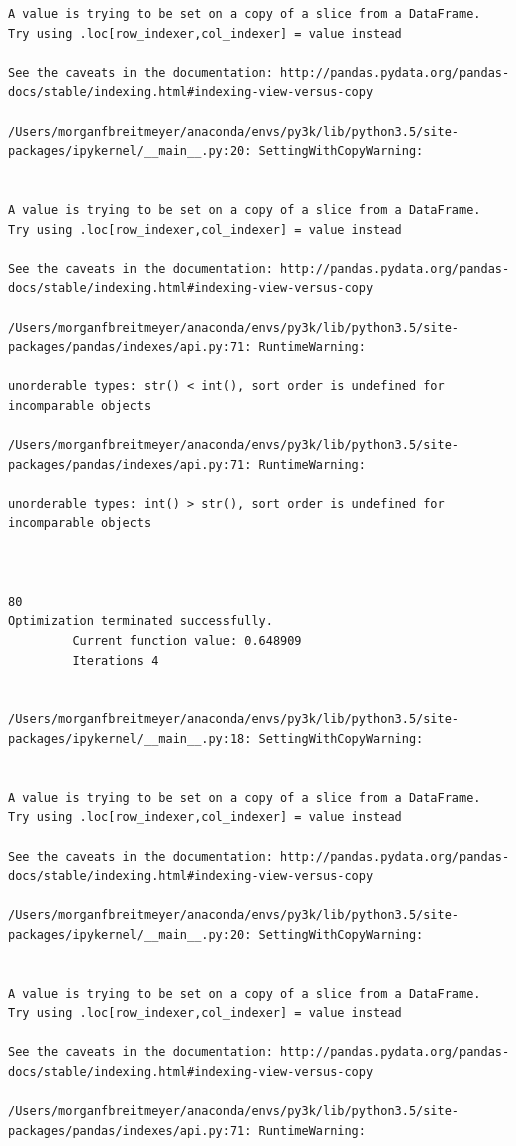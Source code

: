 \begin{lstlisting}
A value is trying to be set on a copy of a slice from a DataFrame.
Try using .loc[row_indexer,col_indexer] = value instead

See the caveats in the documentation: http://pandas.pydata.org/pandas-docs/stable/indexing.html#indexing-view-versus-copy

/Users/morganfbreitmeyer/anaconda/envs/py3k/lib/python3.5/site-packages/ipykernel/__main__.py:20: SettingWithCopyWarning:


A value is trying to be set on a copy of a slice from a DataFrame.
Try using .loc[row_indexer,col_indexer] = value instead

See the caveats in the documentation: http://pandas.pydata.org/pandas-docs/stable/indexing.html#indexing-view-versus-copy

/Users/morganfbreitmeyer/anaconda/envs/py3k/lib/python3.5/site-packages/pandas/indexes/api.py:71: RuntimeWarning:

unorderable types: str() < int(), sort order is undefined for incomparable objects

/Users/morganfbreitmeyer/anaconda/envs/py3k/lib/python3.5/site-packages/pandas/indexes/api.py:71: RuntimeWarning:

unorderable types: int() > str(), sort order is undefined for incomparable objects



80
Optimization terminated successfully.
         Current function value: 0.648909
         Iterations 4


/Users/morganfbreitmeyer/anaconda/envs/py3k/lib/python3.5/site-packages/ipykernel/__main__.py:18: SettingWithCopyWarning:


A value is trying to be set on a copy of a slice from a DataFrame.
Try using .loc[row_indexer,col_indexer] = value instead

See the caveats in the documentation: http://pandas.pydata.org/pandas-docs/stable/indexing.html#indexing-view-versus-copy

/Users/morganfbreitmeyer/anaconda/envs/py3k/lib/python3.5/site-packages/ipykernel/__main__.py:20: SettingWithCopyWarning:


A value is trying to be set on a copy of a slice from a DataFrame.
Try using .loc[row_indexer,col_indexer] = value instead

See the caveats in the documentation: http://pandas.pydata.org/pandas-docs/stable/indexing.html#indexing-view-versus-copy

/Users/morganfbreitmeyer/anaconda/envs/py3k/lib/python3.5/site-packages/pandas/indexes/api.py:71: RuntimeWarning:


\end{lstlisting}
